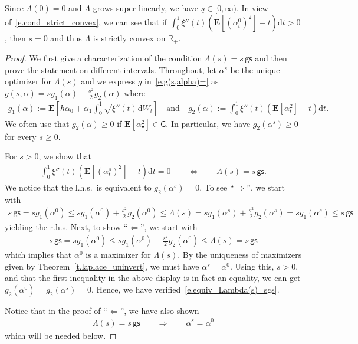 \documentclass[11pt]{amsart}
\theoremstyle{remark}
\theoremstyle{definition}
\numberwithin{equation}{section}
\numberwithin{proposition}{section}
\numberwithin{figure}{section}
\numberwithin{table}{section}
\newcommand{\R}{\mathbb{R}}
\newcommand{\EE}{\mathbf{E}}
\renewcommand{\leq}{\leqslant}
\renewcommand{\geq}{\geqslant}
\newcommand{\Ll}{\left}
\newcommand{\Rr}{\right}
\renewcommand{\d}{\mathrm{d}}
\newcommand{\1}{\mathbf{1}}
\newcommand{\msf}{\mathsf}
\newcommand{\gs}{\msf {gs}}
\begin{document}
Since $\Lambda(0)=0$ and $\Lambda$ grows super-linearly, we have $\underline s \in[0,\infty)$.
In view of~\eqref{e.cond_strict_convex}, we can see that if $\int_0^1\xi''(t) \Ll(\EE\Ll[\Ll(\alpha^0_t\Rr)^2\Rr]-t\Rr)\d t>0$, then $\underline s=0$ and thus $\Lambda$ is strictly convex on $\R_+$.


\begin{proof}
We first give a characterization of the condition $\Lambda(s)=s \, \gs$ and then prove the statement on different intervals. Throughout, let $\alpha^s$ be the unique optimizer for $\Lambda(s)$ and we express $g$ in~\eqref{e.g(s,alpha)=} as $g(s,\alpha) = s g_1(\alpha)+\frac{s^2}{2}g_2(\alpha)$ where
\begin{align*}
    g_1(\alpha):= \EE\Ll[h\alpha_0 + \alpha_1\int_0^1\sqrt{\xi''(t)}\d W_t\Rr]\quad \text{and}\quad g_2(\alpha) :=\int_0^1 \xi''(t)\Ll(\EE\Ll[\alpha_t^2\Rr] -t \Rr)\d t.
\end{align*}
We often use that $g_2(\alpha)\geq 0$ if $\EE[\alpha^2_\bullet]\in\msf G$.
In particular, we have $g_2(\alpha^s)\geq 0$ for every $s\geq0$.

\medskip
{}
For $s>0$, we show that
\begin{align}\label{e.equiv_Lambda(s)=sgs}
    \int_0^1\xi''(t) \Ll(\EE\Ll[\Ll(\alpha^s_t\Rr)^2\Rr]-t\Rr)\d t=0\qquad \Longleftrightarrow \qquad \Lambda(s)=s \, \gs.
\end{align}
We notice that the l.h.s.\ is equivalent to $g_2(\alpha^s)=0$.
To see ``$\Longrightarrow$'', we start with
\begin{align*}
    s \, \gs=sg_1(\alpha^0)\leq s g_1(\alpha^0)+\frac{s^2}{2}g_2(\alpha^0)
    \leq \Lambda(s) = s g_1(\alpha^s)+\frac{s^2}{2}g_2(\alpha^s) = s g_1(\alpha^s) \leq s \, \gs
\end{align*}
yielding the r.h.s. Next, to show ``$\Longleftarrow$'', we start with
\begin{align*}
    s \, \gs=sg_1(\alpha^0)\leq s g_1(\alpha^0)+\frac{s^2}{2}g_2(\alpha^0)
    \leq \Lambda(s) =  s \, \gs
\end{align*}
which implies that $\alpha^0$ is a maximizer for $\Lambda(s)$. By the uniqueness of maximizers given by Theorem~\ref{t.laplace_uninvert}, we must have $\alpha^s=\alpha^0$. Using this, $s>0$, and that the first inequality in the above display is in fact an equality, we can get $g_2(\alpha^0)=g_2(\alpha^s)=0$. Hence, we have verified~\eqref{e.equiv_Lambda(s)=sgs}.

Notice that in the proof of ``$\Longleftarrow$'', we have also shown
\begin{align}\label{e.=>alpha^s=alpha^0}
    \Lambda(s)=s \, \gs\qquad \Longrightarrow \qquad \alpha^s=\alpha^0
\end{align}
which will be needed below.


\end{proof}
\end{document}
